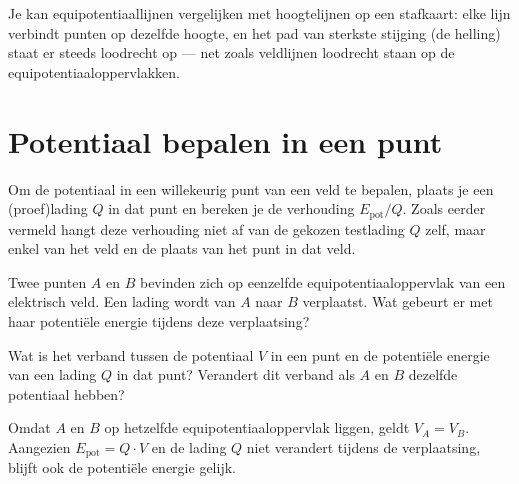 \documentclass{ximera}
\begin{document}
\begin{hint}
    Je kan equipotentiaallijnen vergelijken met hoogtelijnen op een stafkaart: elke lijn verbindt punten op dezelfde hoogte, en het pad van sterkste stijging (de helling) staat er steeds loodrecht op — net zoals veldlijnen loodrecht staan op de equipotentiaaloppervlakken.
\end{hint}

\section{Potentiaal bepalen in een punt}
Om de potentiaal in een willekeurig punt van een veld te bepalen, plaats je een (proef)lading $Q$ in dat punt en bereken je de verhouding $E_{\text{pot}}/Q$. Zoals eerder vermeld hangt deze verhouding niet af van de gekozen testlading $Q$ zelf, maar enkel van het veld en de plaats van het punt in dat veld.

\begin{question}
    Twee punten $A$ en $B$ bevinden zich op eenzelfde equipotentiaaloppervlak van een elektrisch veld. Een lading wordt van $A$ naar $B$ verplaatst. Wat gebeurt er met haar potentiële energie tijdens deze verplaatsing?

    \begin{multipleChoice}
    \end{multipleChoice}

    \begin{hint}
        Wat is het verband tussen de potentiaal $V$ in een punt en de potentiële energie van een lading $Q$ in dat punt? Verandert dit verband als $A$ en $B$ dezelfde potentiaal hebben?
    \end{hint}

    \begin{solution}\nl
        Omdat $A$ en $B$ op hetzelfde equipotentiaaloppervlak liggen, geldt $V_A = V_B$. Aangezien $E_{\text{pot}} = Q \cdot V$ en de lading $Q$ niet verandert tijdens de verplaatsing, blijft ook de potentiële energie gelijk.
    \end{solution}
\end{question}
\end{document}
